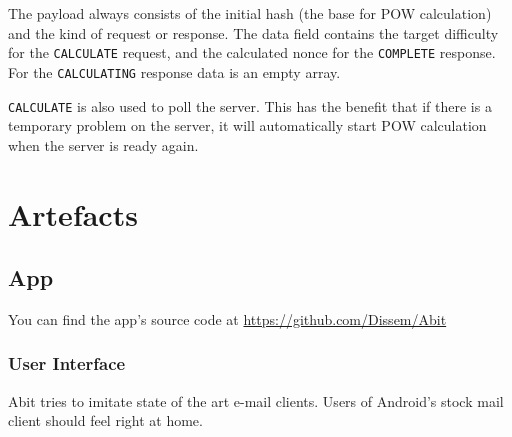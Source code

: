 \documentclass{bfh}
\begin{document}
  The payload always consists of the initial hash (the base for \ac{POW} calculation) and the kind of request or response. The data field contains the target difficulty for the \texttt{CALCULATE} request, and the calculated nonce for the \texttt{COMPLETE} response. For the \texttt{CALCULATING} response data is an empty array.

  \texttt{CALCULATE} is also used to poll the server. This has the benefit that if there is a temporary problem on the server, it will automatically start \ac{POW} calculation when the server is ready again.


  \newpage
  \section{Artefacts}

  \subsection{App}
  You can find the app's source code at \url{https://github.com/Dissem/Abit}

  \subsubsection{User Interface}
  Abit tries to imitate state of the art e-mail clients. Users of Android's stock mail client should feel right at home.
\end{document}
